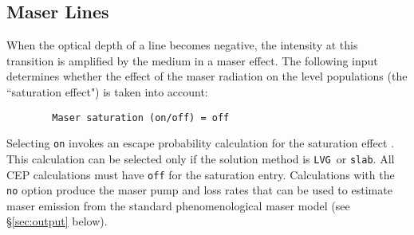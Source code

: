 \documentclass[12pt]{article}
\def\separation {0.5cm}
\def\LVG      {\texttt{LVG}}
\def\slab     {\texttt{slab}}
\begin{document}
\subsection{Maser Lines}
When the optical depth of a line becomes negative, the intensity at this
transition is amplified by the medium in a maser effect. The following input
determines whether the effect of the maser radiation on the level populations
(the ``saturation effect") is taken into account:

\vspace{\separation}
\begin{verbatim}
        Maser saturation (on/off) = off
\end{verbatim}
Selecting {\tt on} invokes an escape probability calculation for the
saturation effect \citep[see \S 5.3 in][]{elitzur92}. This calculation can be
selected only if the solution method is \LVG\ or \slab. All CEP calculations
must have {\tt off} for the saturation entry. Calculations with the {\tt no}
option produce the maser pump and loss rates that can be used to estimate maser
emission from the standard phenomenological maser model (see \S\ref{sec:output} below).







\end{document}
